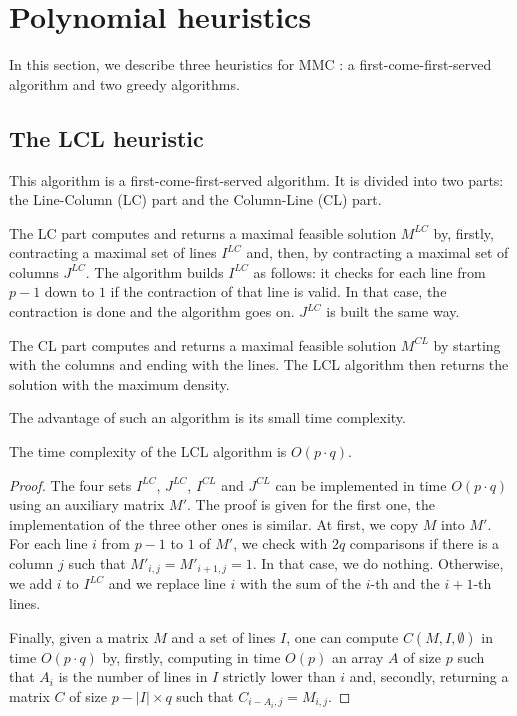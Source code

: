 
\section{Polynomial heuristics}
\label{sect:heuristics}

In this section, we describe three heuristics for MMC : a first-come-first-served algorithm and two greedy algorithms.

\subsection{The LCL heuristic}

This algorithm is a first-come-first-served algorithm. It is divided into two parts: the Line-Column (LC) part and the Column-Line (CL) part. 

The LC part computes and returns a maximal feasible solution $M^{LC}$ by, firstly, contracting a maximal set of lines $I^{LC}$ and, then, by contracting a maximal set of columns $J^{LC}$. The algorithm builds $I^{LC}$ as follows: it checks for each line from $p-1$ down to $1$ if the contraction of that line is valid. In that case, the contraction is done and the algorithm goes on. $J^{LC}$ is built the same way.

The CL part computes and returns a maximal feasible solution $M^{CL}$ by starting with the columns and ending with the lines. The LCL algorithm then returns the solution with the maximum density.

The advantage of such an algorithm is its small time complexity.

\begin{theorem}
	The time complexity of the LCL algorithm is $O(p \cdot q)$. 
\end{theorem}
\begin{proof}
	The four sets $I^{LC}$, $J^{LC}$, $I^{CL}$ and $J^{CL}$ can be implemented in time $O(p \cdot q)$ using an auxiliary matrix $M'$. The proof is given for the first one, the implementation of the three other ones is similar. At first, we copy $M$ into $M'$. For each line $i$ from $p-1$ to $1$ of $M'$, we check with $2q$ comparisons if there is a column $j$ such that $M'_{i,j} = M'_{i+1,j} = 1$. In that case, we do nothing. Otherwise, we add $i$ to $I^{LC}$ and we replace line $i$ with the sum of the $i$-th and the $i+1$-th lines.
	
	Finally, given a matrix $M$ and a set of lines $I$, one can compute $C(M,I,\emptyset)$ in time $O(p \cdot q)$ by, firstly, computing in time $O(p)$ an array $A$ of size $p$ such that $A_i$ is the number of lines in $I$ strictly lower than $i$ and, secondly, returning a matrix $C$ of size $p - |I| \times q$ such that $C_{i-A_i,j} = M_{i,j}$.
\end{proof}

